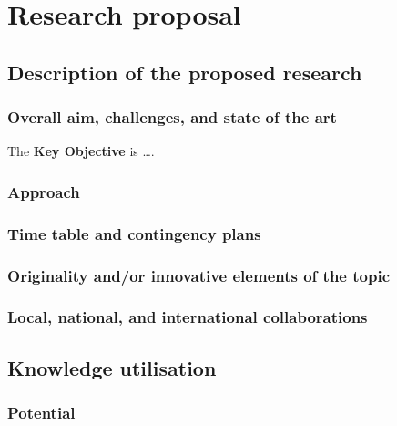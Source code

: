 \section{Research proposal}\label{sec:proposal}

\subsection{Description of the proposed research}\label{sec:aim}

\subsubsection{Overall aim, challenges, and state of the
art}\label{sec:aim}

\begin{framed}

\noindent The \textbf{Key Objective} is \ldots.

\end{framed}

\subsubsection{Approach}\label{sec:approach}

\subsubsection{Time table and contingency plans} 

\subsubsection{Originality and/or innovative elements of the
topic}\label{sec:originality} 

\subsubsection{Local, national, and international collaborations}\label{sec:collaborations}

\subsection{Knowledge utilisation}\label{sec:KU}

\subsubsection{Potential}\label{sec:potential}

